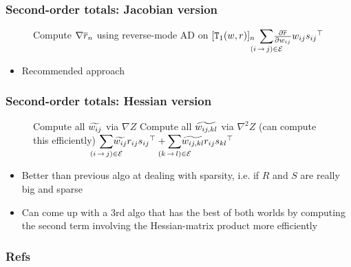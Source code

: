 \documentclass{beamer}
\begin{document}
\begin{frame}
\frametitle{Second-order totals: Jacobian version}

\begin{figure}[H]
\begin{algorithmic}[1]
 {\color{gray}} \label{line:rloop}
\State Compute $\nabla{\overline{r}}_{n}$ using reverse-mode AD on $[\texttt{T}_1(w, r)]_n$
\EndFor
{}
\State \Return ${\displaystyle\smashoperator{\sum_{\edgeij\in\edges}}}
    \frac{\partial \rbar}{\partial \wedge{ij}}\wedge{ij}\sedge{ij}^{\top}$ 
     \label{line:tbar}
\EndFunc
\end{algorithmic}
\end{figure}

\begin{itemize}
\item Recommended approach
\end{itemize}

\end{frame}


\begin{frame}
\frametitle{Second-order totals: Hessian version}

\begin{figure}[H]
\begin{algorithmic}[1]

\State Compute all ${\widetilde{w_{ij}}}$ via $\nabla Z$
\State Compute all ${\widetilde{w_{ij,kl}}}$ via $\nabla^2 Z$ (can compute this efficiently)
\State \Return ${\displaystyle\smashoperator{\sum_{\edgeij\in\edges}}}\totalw{ij}\redge{ij}\sedge{ij}^\top + {\displaystyle\smashoperator{\sum_{\edgekl\in\edges}}}\totalw{ij,kl}\redge{ij}\sedge{kl}^\top$ \label{line:acum}
\EndFunc

\end{algorithmic}
\end{figure}

\begin{itemize}
    \item Better than previous algo at dealing with sparsity,
        i.e. if $R$ and $S$ are really big and sparse
    \item Can come up with a 3rd algo that has the best of both worlds
        by computing the second term involving the
        Hessian-matrix product more efficiently
\end{itemize}

\end{frame}

\begin{frame}[allowframebreaks]
\frametitle{Refs}

\end{frame}
\end{document}
